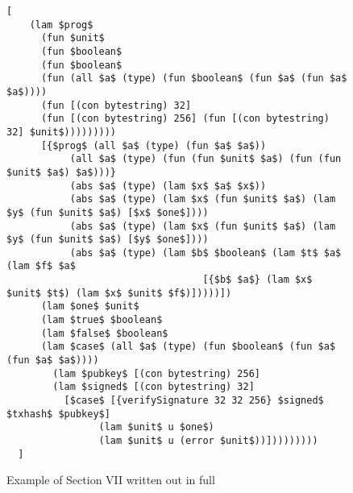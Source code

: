 \documentclass[../main.tex]{subfiles}
\begin{document}
\begin{figure*}
\begin{lstlisting}[basicstyle=\ttfamily,mathescape]
  [
    (lam $prog$
      (fun $unit$ 
      (fun $boolean$
      (fun $boolean$
      (fun (all $a$ (type) (fun $boolean$ (fun $a$ (fun $a$ $a$))))
      (fun [(con bytestring) 32]
      (fun [(con bytestring) 256] (fun [(con bytestring) 32] $unit$)))))))))
      [{$prog$ (all $a$ (type) (fun $a$ $a$))
           (all $a$ (type) (fun (fun $unit$ $a$) (fun (fun $unit$ $a$) $a$)))}
           (abs $a$ (type) (lam $x$ $a$ $x$))
           (abs $a$ (type) (lam $x$ (fun $unit$ $a$) (lam $y$ (fun $unit$ $a$) [$x$ $one$])))
           (abs $a$ (type) (lam $x$ (fun $unit$ $a$) (lam $y$ (fun $unit$ $a$) [$y$ $one$])))
           (abs $a$ (type) (lam $b$ $boolean$ (lam $t$ $a$ (lam $f$ $a$
                                  [{$b$ $a$} (lam $x$ $unit$ $t$) (lam $x$ $unit$ $f$)]))))])
      (lam $one$ $unit$
      (lam $true$ $boolean$
      (lam $false$ $boolean$
      (lam $case$ (all $a$ (type) (fun $boolean$ (fun $a$ (fun $a$ $a$))))
        (lam $pubkey$ [(con bytestring) 256]
        (lam $signed$ [(con bytestring) 32]
          [$case$ [{verifySignature 32 32 256} $signed$ $txhash$ $pubkey$]
                (lam $unit$ u $one$)
                (lam $unit$ u (error $unit$))]))))))))
  ]
\end{lstlisting}
\caption{Example of Section VII written out in full}
\label{fig:Continuized_Let_Example}
\end{figure*}
\end{document}
